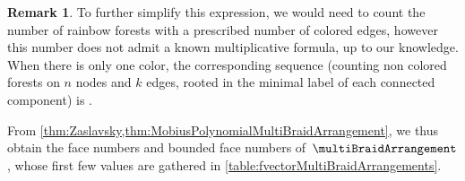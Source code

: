 \documentclass{amsart}
\theoremstyle{definition}
\newtheorem{remark}[theorem]{Remark}
\newcommand{\OEIS}[1]{\cite[{\rm \href{http://oeis.org/#1}{\texttt{#1}}}]{OEIS}}
\begin{document}
\begin{remark}
To further simplify this expression, we would need to count the number of rainbow forests with a prescribed number of colored edges, however this number does not admit a  known multiplicative formula, up to our knowledge. When there is only one color, the corresponding sequence (counting non colored forests on $n$ nodes and $k$ edges, rooted in the minimal label of each connected component) is \OEIS{A138464}.
\end{remark}

From \cref{thm:Zaslavsky,thm:MobiusPolynomialMultiBraidArrangement}, we thus obtain the face numbers and bounded face numbers of~$\multiBraidArrangement$, whose first few values are gathered in \cref{table:fvectorMultiBraidArrangements}.

\end{document}
